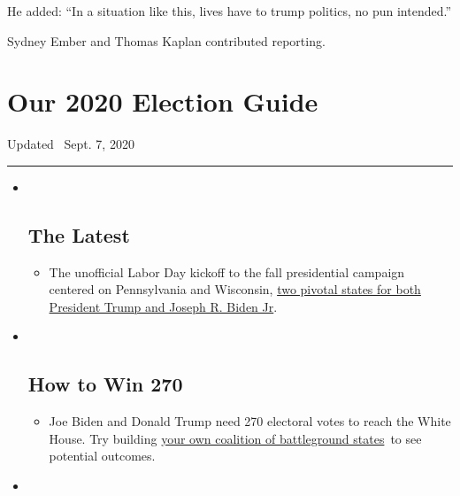 He added: ``In a situation like this, lives have to trump politics, no
pun intended.''

Sydney Ember and Thomas Kaplan contributed reporting.

\hypertarget{our-2020-election-guide}{%
\section{Our 2020 Election Guide}\label{our-2020-election-guide}}

Updated ~Sept. 7, 2020

\begin{center}\rule{0.5\linewidth}{\linethickness}\end{center}

\begin{itemize}
\item ~
  \hypertarget{the-latest}{%
  \subsection{The Latest}\label{the-latest}}

  \begin{itemize}
  \item
    The unofficial Labor Day kickoff to the fall presidential campaign
    centered on Pennsylvania and Wisconsin,
    \href{https://www.nytimes3xbfgragh.onion/2020/09/07/us/politics/wisconsin-biden-harris-trump-pence.html?action=click\&pgtype=Article\&state=default\&region=BELOW_MAIN_CONTENT\&context=storylines_guide}{two
    pivotal states for both President Trump and Joseph R. Biden Jr}.
  \end{itemize}
\item ~
  \hypertarget{how-to-win-270}{%
  \subsection{How to Win 270}\label{how-to-win-270}}

  \begin{itemize}
  \item
    Joe Biden and Donald Trump need 270 electoral votes to reach the
    White House. Try building
    \href{https://www.nytimes3xbfgragh.onion/interactive/2020/us/elections/election-states-biden-trump.html?action=click\&pgtype=Article\&state=default\&region=BELOW_MAIN_CONTENT\&context=storylines_guide}{your
    own coalition of battleground states}~to see potential outcomes.
  \end{itemize}
\item ~
  \hypertarget{voting-by-mail}{%
}
\end{itemize}
